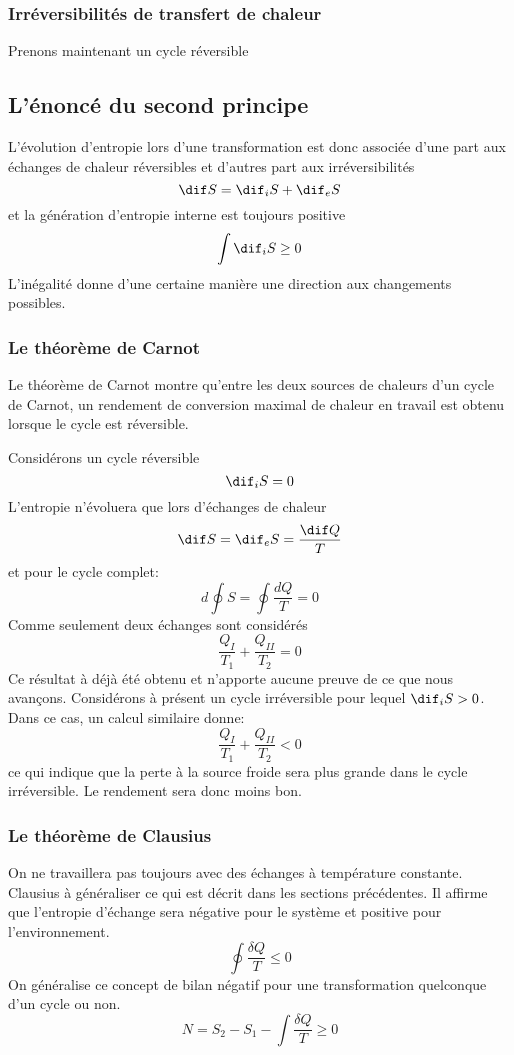 \subsubsection{Irréversibilités de transfert de chaleur}
Prenons maintenant un cycle réversible

\subsection{L'énoncé du second principe}
L'évolution d'entropie lors d'une transformation est
donc associée d'une part aux échanges de chaleur réversibles et
d'autres part aux irréversibilités
\[ \dif S = \dif_iS+\dif_eS \]
et la génération d'entropie interne est toujours positive
\[ \int \dif_iS \geq 0  \]
L'inégalité donne d'une certaine manière une direction
aux changements possibles.

\subsubsection{Le théorème de Carnot}
Le théorème de Carnot montre qu'entre les deux sources de chaleurs
d'un cycle de Carnot, un rendement de conversion  maximal de chaleur
en travail est obtenu lorsque le cycle est réversible.

Considérons un cycle réversible
\[ \dif_iS = 0 \]
L'entropie n'évoluera que lors d'échanges de chaleur
\[ \dif S = \dif_eS = \frac{\dif Q}T \]
et pour le cycle complet:
\[ d\oint S = \oint \frac {dQ}{T} = 0 \]
Comme seulement deux échanges sont considérés
\[ \frac{Q_I}{T_1}+\frac{Q_{II}}{T_2} = 0 \]
Ce résultat à déjà été obtenu et n'apporte aucune preuve
de ce que nous avançons.
Considérons à présent un cycle irréversible pour lequel $\dif_iS > 0$.
Dans ce cas, un calcul similaire donne:
\[ \frac{Q_I}{T_1}+\frac{Q_{II}}{T_2} < 0 \]
ce qui indique que la perte à la source froide sera
plus grande dans le cycle irréversible.
Le rendement sera donc moins bon.

\subsubsection{Le théorème de Clausius}
On ne travaillera pas toujours avec des échanges à température constante.
Clausius à généraliser ce qui est décrit dans les sections précédentes.
Il affirme que l'entropie d'échange sera négative pour le système et
positive pour l'environnement.
\[ \oint \frac{\delta Q}T \leq 0  \]
On généralise ce concept de bilan négatif pour
une transformation quelconque d'un cycle ou non.
\[ N = S_2-S_1-\int \frac{\delta Q}T \geq 0 \]

